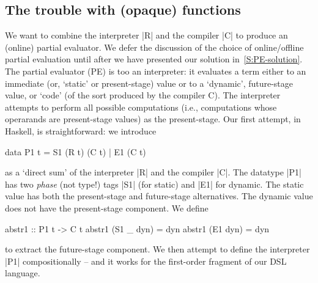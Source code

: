 \documentclass[preprint]{sigplanconf}
\begin{document}
\subsection{The trouble with (opaque) functions}
\label{S:PE-problem}
We want to combine the interpreter |R| and the compiler |C| to produce
an (online) partial evaluator.  We defer the discussion of the 
choice of online/offline partial evaluation until after we have presented our
solution in~\ref{S:PE-solution}.
The partial evaluator (PE) is too an interpreter: it
evaluates a term either to an immediate (or, `static' or present-stage)
value or to a `dynamic', future-stage value, or `code' (of the sort
produced by the compiler C). The interpreter attempts to perform all
possible computations (i.e., computations whose operarands are
present-stage values) as the present-stage. Our first attempt, in
Haskell, is straightforward: we introduce
\begin{code}
data P1 t = S1 (R t) (C t) | E1 (C t)
\end{code}
as a `direct sum' of the interpreter |R| and the compiler |C|. The
datatype |P1| has two \emph{phase} (not type!) tags |S1| 
(for static) and |E1| for dynamic. The static value has both the
present-stage and future-stage alternatives. The dynamic value does
not have the present-stage component. We define
\begin{code}
abstr1 :: P1 t -> C t
abstr1 (S1 _ dyn) = dyn
abstr1 (E1 dyn)   = dyn
\end{code}
to extract the future-stage component. We then attempt to define the
interpreter |P1| compositionally -- and it works for the first-order
fragment of our DSL language.
\end{document}
